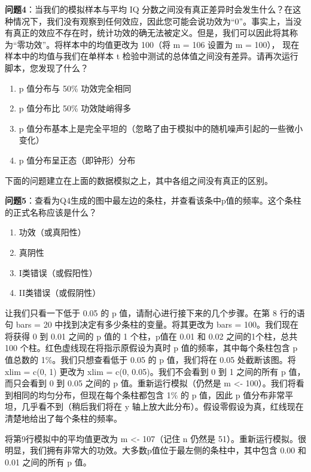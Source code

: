\documentclass[
  letterpaper,
  DIV=11,
  numbers=noendperiod]{scrreprt}
\providecommand{\tightlist}{%
  \setlength{\itemsep}{0pt}\setlength{\parskip}{0pt}}\usepackage{longtable,booktabs,array}
\begin{document}
\textbf{问题4}：当我们的模拟样本与平均 IQ
分数之间没有真正差异时会发生什么？在这种情况下，我们没有观察到任何效应，因此您可能会说功效为``0''。事实上，当没有真正的效应不存在时，统计功效的确无法被定义。但是，我们可以因此将其称为``零功效''。将样本中的均值更改为
100（将 m = 106 设置为 m = 100）， 现在样本中的均值与我们在单样本 t
检验中测试的总体值之间没有差异。请再次运行脚本，您发现了什么？

\begin{enumerate}
\def\labelenumi{\Alph{enumi})}
\tightlist
\item
  p 值分布与 50\% 功效完全相同
\item
  p 值分布比 50\% 功效陡峭得多
\item
  p
  值分布基本上是完全平坦的（忽略了由于模拟中的随机噪声引起的一些微小变化）
\item
  p 值分布呈正态（即钟形）分布
\end{enumerate}

下面的问题建立在上面的数据模拟之上，其中各组之间没有真正的区别。

\textbf{问题5}：查看为Q4生成的图中最左边的条柱，并查看该条中p值的频率。这个条柱的正式名称应该是什么？

\begin{enumerate}
\def\labelenumi{\Alph{enumi})}
\tightlist
\item
  功效（或真阳性）
\item
  真阴性
\item
  I类错误（或假阳性）
\item
  II类错误（或假阴性）
\end{enumerate}

让我们只看一下低于 0.05 的 p 值，请耐心进行接下来的几个步骤。在第 8
行的语句 bars = 20 中找到决定有多少条柱的变量。将其更改为 bars =
100。我们现在将获得 0 到 0.01 之间的 p 值的 1 个柱，p值在 0.01 和 0.02
之间的1个柱，总共 100 个柱。红色虚线现在将指示原假设为真时 p
值的频率，其中每个条柱包含 p 值总数的 1\%。我们只想查看低于 0.05 的 p
值，我们将在 0.05 处截断该图。将 xlim = c(0, 1) 更改为 xlim = c(0,
0.05)。我们不会看到 0 到 1 之间的所有 p 值，而只会看到 0 到 0.05 之间的
p 值。重新运行模拟（仍然是 m \textless-
100）。我们将看到相同的均匀分布，但现在每个条柱都包含 1\% 的 p 值，因此
p 值分布非常平坦，几乎看不到（稍后我们将在 y
轴上放大此分布）。假设零假设为真，红线现在清楚地给出了每个条柱的频率。

将第9行模拟中的平均值更改为 m \textless- 107（记住 n 仍然是
51）。重新运行模拟。很明显，我们拥有非常大的功效。大多数p值位于最左侧的条柱中，其中包含
0.00 和 0.01 之间的所有 p 值。
\end{document}

